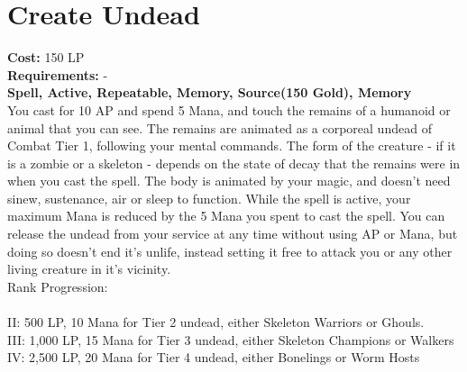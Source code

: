 \section{Create Undead}\label{spell:createUndead}
\textbf{Cost:} 150 LP\\
\textbf{Requirements:} -\\
\textbf{Spell, Active, Repeatable, Memory, Source(150 Gold), Memory}\\
You cast for 10 AP and spend 5 Mana, and touch the remains of a humanoid or animal that you can see.
The remains are animated as a corporeal undead of Combat Tier 1, following your mental commands.
The form of the creature - if it is a zombie or a skeleton - depends on the state of decay that the remains were in when you cast the spell.
The body is animated by your magic, and doesn't need sinew, sustenance, air or sleep to function.
While the spell is active, your maximum Mana is reduced by the 5 Mana you spent to cast the spell.
You can release the undead from your service at any time without using AP or Mana, but doing so doesn't end it's unlife, instead setting it free to attack you or any other living creature in it's vicinity.
\\
Rank Progression:\\
\\
II: 500 LP, 10 Mana for Tier 2 undead, either Skeleton Warriors or Ghouls.\\
III: 1,000 LP, 15 Mana for Tier 3 undead, either Skeleton Champions or Walkers\\
IV: 2,500 LP, 20 Mana for Tier 4 undead, either Bonelings or Worm Hosts\\
